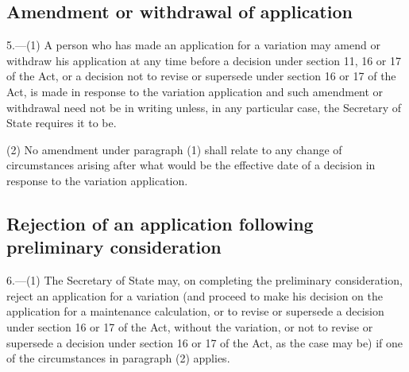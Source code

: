 \documentclass[12pt,a4paper]{article}
\begin{document}
\subsection[5. Amendment or withdrawal of application]{Amendment or withdrawal of application}

5.---(1)  A person who has made an application for a variation may amend or withdraw his application at any time before a decision under section 11, 16 or 17 of the Act, or a decision not to revise or supersede under section 16 or 17 of the Act, is made in response to the variation application and such amendment or withdrawal need not be in writing unless, in any particular case, the Secretary of State requires it to be.

(2) No amendment under paragraph (1) shall relate to any change of circumstances arising after what would be the effective date of a decision in response to the variation application.

\subsection[6. Rejection of an application following preliminary consideration]{Rejection of an application following preliminary consideration}

6.---(1)  The Secretary of State may, on completing the preliminary consideration, reject an application for a variation (and proceed to make his decision on the application for a maintenance calculation, or to revise or supersede a decision under section 16 or 17 of the Act, without the variation, or not to revise or supersede a decision under section 16 or 17 of the Act, as the case may be) if one of the circumstances in paragraph (2) applies.
\end{document}
